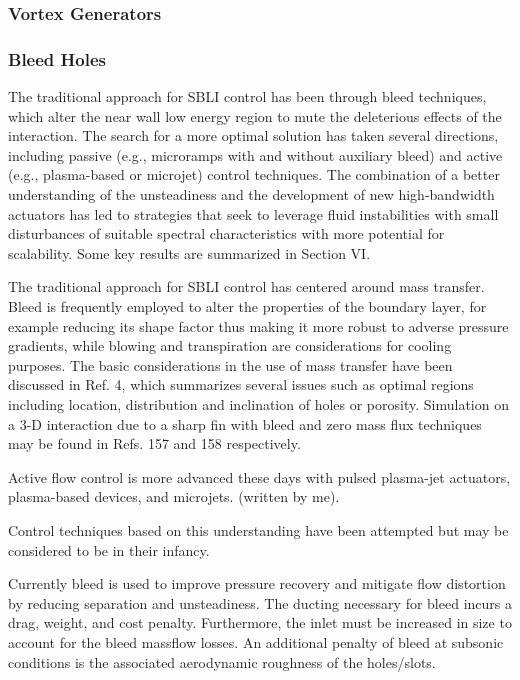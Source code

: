 \subsubsection{Vortex Generators}


\subsubsection{Bleed Holes}

The traditional approach for SBLI control has been through bleed techniques, which alter the near wall low energy region to mute the deleterious effects of the interaction. The search for a more optimal solution has taken several directions, including passive (e.g., microramps with and without auxiliary bleed) and active (e.g., plasma-based or microjet) control techniques. The combination of a better understanding of the unsteadiness and the development of new high-bandwidth actuators has led to strategies that seek to leverage fluid instabilities with small disturbances of suitable spectral characteristics with more potential for scalability. Some key results are summarized in Section VI. \cite{Gaitonde2013}

The traditional approach for SBLI control has centered around mass transfer. Bleed is frequently employed to alter the properties of the boundary layer, for example reducing its shape factor thus making it more robust to adverse pressure gradients, while blowing and transpiration are considerations for cooling purposes. The basic considerations in the use of mass transfer have been discussed in Ref. 4, which summarizes several issues such as optimal regions including location, distribution and inclination of holes or porosity. Simulation on a 3-D interaction due to a sharp fin with bleed and zero mass flux techniques may be found in Refs. 157 and 158 respectively. \cite{Gaitonde2013}

Active flow control is more advanced these days with pulsed plasma-jet actuators, plasma-based devices, and microjets. (written by me).

Control techniques based on this understanding have been attempted but may be considered to be in their infancy. \cite{Gaitonde2013}

Currently bleed is used to improve pressure recovery and mitigate flow distortion by reducing separation and unsteadiness. The ducting necessary for bleed incurs a drag, weight, and cost penalty. Furthermore, the inlet must be increased in size to account for the bleed massflow losses. An additional penalty of bleed at subsonic conditions is the associated aerodynamic roughness of the holes/slots. \cite{Dolling2001}

